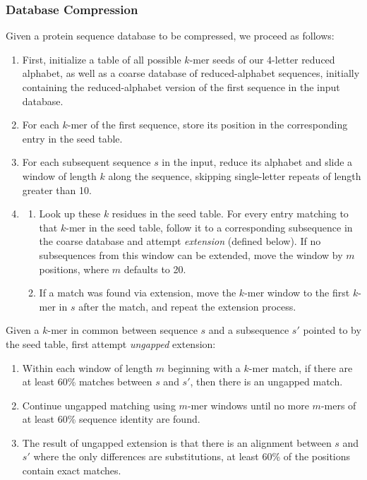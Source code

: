 \documentclass[review,preprint,12pt]{elsarticle}
\theoremstyle{definition}
\theoremstyle{remark}
\begin{document}
\subsubsection{Database Compression}

Given a protein sequence database to be compressed, we proceed as follows:
\begin{enumerate}
        \item First, initialize a table of all possible $k$-mer seeds of
        our 4-letter reduced alphabet, as well as a coarse database of
        reduced-alphabet sequences, initially containing the reduced-alphabet
        version of the first sequence in the input database.
        \item For each $k$-mer of the first sequence, store its position in the
        corresponding entry in the seed table.
        \item For each subsequent sequence $s$ in the input, reduce its 
        alphabet and slide a window of 
        length $k$ along the sequence, skipping single-letter repeats of length
        greater than 10.
        \item
        \begin{enumerate}
        \item Look up these $k$ residues in the seed table.
        For every entry matching to that $k$-mer in the seed table, follow
        it to a corresponding subsequence in the coarse database and attempt
        \textit{extension} (defined below).
        If no subsequences from this window can be extended, move the window
        by $m$ positions, where $m$ defaults to 20.
        \item If a match was found via extension, move the $k$-mer window to
        the first $k$-mer in $s$ after the match, and repeat the extension
        process.
        \end{enumerate}
\end{enumerate}
        
Given a $k$-mer in common between sequence $s$ and a subsequence $s'$ pointed to by the
seed table, first attempt \textit{ungapped} extension:
\begin{enumerate}
        \item Within each window of length $m$ beginning with a $k$-mer match, 
        if there are at least 60\% matches between $s$ and $s'$, then there is 
        an ungapped match.
        \item Continue ungapped matching using $m$-mer windows until no more
        $m$-mers of at least 60\% sequence identity are found.
        \item The result of ungapped extension is that there is an alignment 
        between $s$ and $s'$ where the only differences are substitutions,
        at least 60\% of the positions contain exact matches.
\end{enumerate}
        
\end{document}
